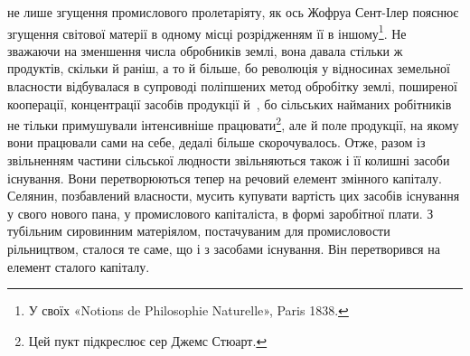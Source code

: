 \parcont{}  %
не лише згущення промислового пролетаріяту, як ось Жофруа
Сент-Ілер пояснює згущення світової матерії в одному
місці розрідженням її в іншому\footnote{
У своїх «Notions de Philosophie Naturelle», Paris 1838.
}. Не зважаючи на зменшення
числа обробників землі, вона давала стільки ж продуктів, скільки
й раніш, а то й більше, бо революція у відносинах земельної
власности відбувалася в супроводі поліпшених метод обробітку
землі, поширеної кооперації, концентрації засобів продукції й~, бо сільських найманих робітників не тільки примушували
інтенсивніше працювати\footnote{
Цей пукт підкреслює сер Джемс Стюарт.
}, але й поле продукції, на якому
вони працювали сами на себе, дедалі більше скорочувалось.
Отже, разом із звільненням частини сільської людности звільняються
також і її колишні засоби існування. Вони перетворюються
тепер на речовий елемент змінного капіталу. Селянин,
позбавлений власности, мусить купувати вартість цих засобів
існування у свого нового пана, у промислового капіталіста, в
формі заробітної плати. З тубільним сировинним матеріялом,
постачуваним для промисловости рільництвом, сталося те саме,
що і з засобами існування. Він перетворився на елемент сталого
капіталу.

